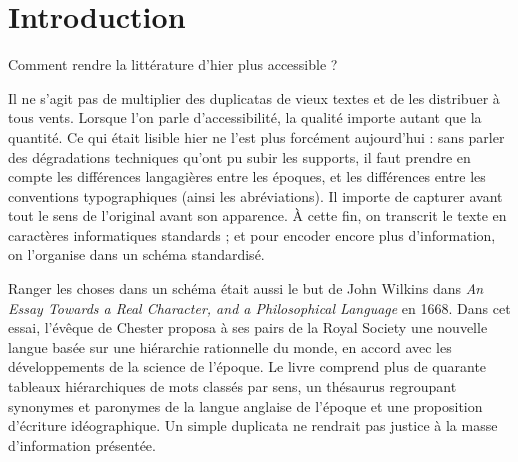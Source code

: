 \chapter*{Introduction}\label{introduction}

Comment rendre la littérature d'hier plus accessible ?

Il ne s'agit pas de multiplier des duplicatas de vieux textes et de les distribuer à tous vents.
Lorsque l'on parle d'accessibilité, la qualité importe autant que la quantité.
Ce qui était lisible hier ne l'est plus forcément aujourd'hui : sans parler des dégradations techniques qu'ont pu subir les supports, il faut prendre en compte les différences langagières entre les époques, et les différences entre les conventions typographiques (ainsi les abréviations).
Il importe de capturer avant tout le sens de l'original avant son apparence.
À cette fin, on transcrit le texte en caractères informatiques standards ; et pour encoder encore plus d'information, on l'organise dans un schéma standardisé.

Ranger les choses dans un schéma était aussi le but de John Wilkins dans \emph{An Essay Towards a Real Character, and a Philosophical Language} en 1668.
Dans cet essai, l'évêque de Chester proposa à ses pairs de la Royal Society une nouvelle langue basée sur une hiérarchie rationnelle du monde, en accord avec les développements de la science de l'époque.
Le livre comprend plus de quarante tableaux hiérarchiques de mots classés par sens, un thésaurus regroupant synonymes et paronymes de la langue anglaise de l'époque et une proposition d'écriture idéographique.
Un simple duplicata ne rendrait pas justice à la masse d'information présentée.